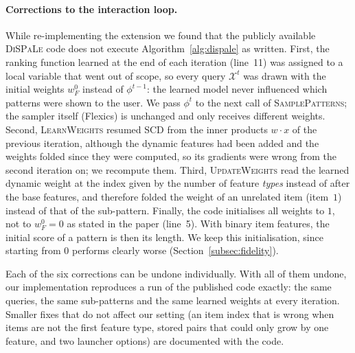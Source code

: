\paragraph{Corrections to the interaction loop.}
While re-implementing the extension we found that the publicly available \textsc{DiSPaLe} code does not
execute Algorithm~\ref{alg:dispale} as written. First, the ranking function learned at the end of each
iteration (line~11) was assigned to a local variable that went out of scope, so every query $\mathcal X^t$ was
drawn with the initial weights $w_F^0$ instead of $\phi^{t-1}$: the learned model never influenced which
patterns were shown to the user. We pass $\phi^t$ to the next call of \textsc{SamplePatterns}; the sampler
itself (Flexics) is unchanged and only receives different weights. Second, \textsc{LearnWeights} resumed
SCD from the inner products $w \cdot x$ of the previous iteration, although the dynamic features had been added
and the weights folded since they were computed, so its gradients were wrong from the second iteration on; we
recompute them. Third, \textsc{UpdateWeights} read the learned dynamic weight at the index given by the number
of feature \emph{types} instead of after the base features, and therefore folded the weight of an unrelated
item (item~$1$) instead of that of the sub-pattern. Finally, the code initialises all weights to $1$, not to $w_F^0 = 0$ as
stated in the paper (line~5). With binary item features, the initial score of a pattern is then its length.
We keep this initialisation, since starting from $0$ performs clearly worse (Section~\ref{subsec:fidelity}).

Each of the six corrections can be undone individually. With all of them undone, our implementation
reproduces a run of the published code exactly: the same queries, the same sub-patterns and the same learned
weights at every iteration. Smaller fixes that do not affect our setting (an item index that is wrong when
items are not the first feature type, stored pairs that could only grow by one feature, and two launcher
options) are documented with the code.


